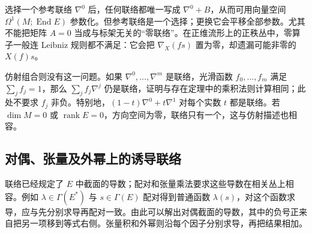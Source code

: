 选择一个参考联络 \(\nabla^0\) 后，任何联络都唯一写成 \(\nabla^0+B\)，从而可用向量空间 \(\Omega^1(M;\operatorname{End}E)\) 参数化。但参考联络是一个选择；更换它会平移全部参数。尤其不能把矩阵 \(A=0\) 当成与标架无关的“零联络”。在正维流形上的正秩丛中，零算子一般连 Leibniz 规则都不满足：它会把 \(\nabla_X(fs)\) 置为零，却遗漏可能非零的 \(X(f)s\)。

\ProseParagraphBreak

仿射组合则没有这一问题。如果 \(\nabla^0,\ldots,\nabla^m\) 是联络，光滑函数 \(f_0,\ldots,f_m\) 满足 \(\sum_j f_j=1\)，那么 \(\sum_j f_j\nabla^j\) 仍是联络，证明与存在定理中的乘积法则计算相同；此处不要求 \(f_j\) 非负。特别地，\((1-t)\nabla^0+t\nabla^1\) 对每个实数 \(t\) 都是联络。若 \(\dim M=0\) 或 \(\operatorname{rank}E=0\)，方向空间为零，联络只有一个，这与仿射描述也相容。

\subsection{对偶、张量及外幂上的诱导联络}
\label{g1:subsec:1501:04}

联络已经规定了 \(E\) 中截面的导数；配对和张量乘法要求这些导数在相关丛上相容。例如 \(\lambda\in\Gamma(E^*)\) 与 \(s\in\Gamma(E)\) 配对得到普通函数 \(\lambda(s)\)，对这个函数求导，应与先分别求导再配对一致。由此可以解出对偶截面的导数，其中的负号正来自把另一项移到等式右侧。张量积和外幂则沿每个因子分别求导，再把结果相加。

